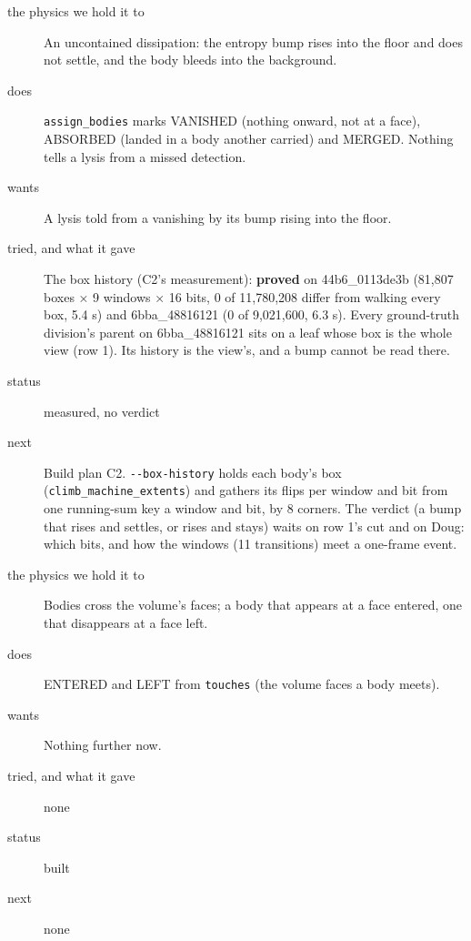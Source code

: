 \begin{description}
\item[{the physics we hold it to}] An uncontained dissipation: the entropy bump rises into the floor and does not settle, and the body bleeds into the background.
\item[{does}] \texttt{assign\_\allowbreak{}bodies} marks VANISHED (nothing onward, not at a face), ABSORBED (landed in a body another carried) and MERGED. Nothing tells a lysis from a missed detection.
\item[{wants}] A lysis told from a vanishing by its bump rising into the floor.
\item[{tried, and what it gave}] The box history (C2's measurement): \textbf{proved} on 44b6\_\allowbreak{}0113de3b (81,807 boxes × 9 windows × 16 bits, 0 of 11,780,208 differ from walking every box, 5.4 s) and 6bba\_\allowbreak{}48816121 (0 of 9,021,600, 6.3 s). Every ground-truth division's parent on 6bba\_\allowbreak{}48816121 sits on a leaf whose box is the whole view (row 1). Its history is the view's, and a bump cannot be read there.
\item[{status}] measured, no verdict
\item[{next}] Build plan C2. \texttt{-\allowbreak{}-\allowbreak{}box-\allowbreak{}history} holds each body's box (\texttt{climb\_\allowbreak{}machine\_\allowbreak{}extents}) and gathers its flips per window and bit from one running-sum key a window and bit, by 8 corners. The verdict (a bump that rises and settles, or rises and stays) waits on row 1's cut and on Doug: which bits, and how the windows (11 transitions) meet a one-frame event.
\end{description}

\begin{description}
\item[{the physics we hold it to}] Bodies cross the volume's faces; a body that appears at a face entered, one that disappears at a face left.
\item[{does}] ENTERED and LEFT from \texttt{touches} (the volume faces a body meets).
\item[{wants}] Nothing further now.
\item[{tried, and what it gave}] none
\item[{status}] built
\item[{next}] none
\end{description}

